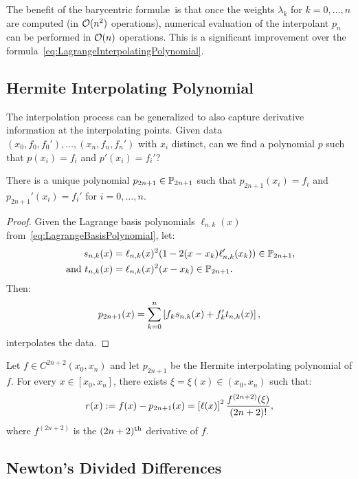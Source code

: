 The benefit of the barycentric formul\ae~is that once the weights $\lambda_k$ for $k=0,\ldots,n$ are computed (in $\OO(n^2)$ operations), numerical evaluation of the interpolant $p_n$ can be performed in $\OO(n)$ operations. This is a significant improvement over the formula~\eqref{eq:LagrangeInterpolatingPolynomial}.

\subsection{Hermite Interpolating Polynomial}

The interpolation process can be generalized to also capture derivative information at the interpolating points. Given data $(x_0,f_0,f_0'),\ldots,(x_n,f_n,f_n')$ with $x_i$ distinct, can we find a polynomial $p$ such that $p(x_i) = f_i$ and $p'(x_i) = f_i'$?

\begin{theorem}
There is a unique polynomial $p_{2n+1}\in\P_{2n+1}$ such that $p_{2n+1}(x_i) = f_i$ and $p_{2n+1}'(x_i) = f_i'$ for $i=0,\ldots,n$.
\end{theorem}
\begin{proof}
Given the Lagrange basis polynomials $\ell_{n,k}(x)$ from~\eqref{eq:LagrangeBasisPolynomial}, let:
\begin{align*}
s_{n,k}(x) & = \ell_{n,k}(x)^2(1-2(x-x_k)\ell_{n,k}'(x_k))\in\P_{2n+1},\\
\qand t_{n,k}(x) & = \ell_{n,k}(x)^2(x-x_k)\in\P_{2n+1}.
\end{align*}
Then:
\begin{equation}
p_{2n+1}(x) = \sum_{k=0}^n\br[f_k s_{n,k}(x) + f_k't_{n,k}(x)],
\end{equation}
interpolates the data.
\end{proof}

\begin{theorem}
Let $f\in C^{2n+2}(x_0,x_n)$ and let $p_{2n+1}$ be the Hermite interpolating polynomial of $f$. For every $x\in[x_0,x_n]$, there exists $\xi = \xi(x) \in (x_0,x_n)$ such that:
\[
r(x) := f(x)-p_{2n+1}(x) = \br[\ell(x)]^2\dfrac{f^{(2n+2)}(\xi)}{(2n+2)!},
\]
where $f^{(2n+2)}$ is the $(2n+2)^{\rm th}$ derivative of $f$.
\end{theorem}

\subsection{Newton's Divided Differences}

